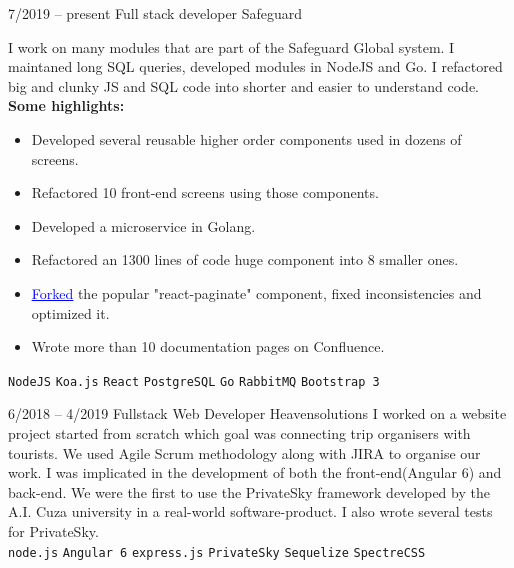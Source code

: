 \documentclass[9pt]{developercv} %
\begin{document}
\begin{entrylist}
	\entry
		{7/2019 -- present}
		{Full stack developer}
		{Safeguard}
		{I work on many modules that are part of the Safeguard Global system. I maintaned 
		long SQL queries, developed modules in NodeJS and Go. I refactored big and
		 clunky JS and SQL code into shorter and easier to understand code. 
		\\   \textbf{Some highlights:}
		\begin{itemize}
			\setlength\itemsep{0em}
				\item Developed several reusable higher order components used in dozens of screens. 
				\item Refactored 10 front-end screens using those components. 
				\item Developed a microservice in Golang. 
				\item Refactored an 1300 lines of code huge component into 8 smaller ones.
				\item \href{https://www.npmjs.com/package/react-paginate-next}{\textcolor{blue}{\underline{Forked}}} the popular "react-paginate" component, fixed inconsistencies and optimized it.
				\item Wrote more than 10 documentation pages on Confluence.
		\end{itemize}
		\texttt{NodeJS}\slashsep
		\texttt{Koa.js}\slashsep
		\texttt{React}\slashsep
		\texttt{PostgreSQL}\slashsep
		\texttt{Go}\slashsep
		\texttt{RabbitMQ}\slashsep
		\texttt{Bootstrap 3}
		}
	\entry
		{6/2018 -- 4/2019}
		{Fullstack Web Developer}
		{Heavensolutions}
		{I worked on a website project started from scratch which goal was connecting trip organisers 
		with tourists. We used Agile Scrum methodology along with JIRA to organise our work. 
		I was implicated in the development of both the front-end(Angular 6) and back-end.
		 We were the first to use the PrivateSky framework developed by the A.I. Cuza university in
		 a real-world software-product. I also wrote several tests for PrivateSky.
		\\  \texttt{node.js}\slashsep
			\texttt{Angular 6}\slashsep
			\texttt{express.js}\slashsep
		    \texttt{PrivateSky}\slashsep
		    \texttt{Sequelize}\slashsep
		    \texttt{SpectreCSS}
		}
\end{entrylist}
\end{document}
